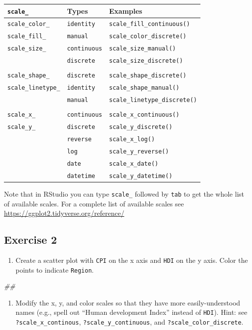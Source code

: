 \documentclass[]{book}
\newenvironment{Shaded}{\begin{snugshade}}{\end{snugshade}}
\newcommand{\CommentTok}[1]{\textcolor[rgb]{0.56,0.35,0.01}{\textit{#1}}}
\providecommand{\tightlist}{%
  \setlength{\itemsep}{0pt}\setlength{\parskip}{0pt}}
\begin{document}
\begin{longtable}[]{@{}lll@{}}
\toprule
\texttt{scale\_} & Types & Examples\tabularnewline
\midrule
\endhead
\texttt{scale\_color\_} & \texttt{identity} & \texttt{scale\_fill\_continuous()}\tabularnewline
\texttt{scale\_fill\_} & \texttt{manual} & \texttt{scale\_color\_discrete()}\tabularnewline
\texttt{scale\_size\_} & \texttt{continuous} & \texttt{scale\_size\_manual()}\tabularnewline
& \texttt{discrete} & \texttt{scale\_size\_discrete()}\tabularnewline
& &\tabularnewline
\texttt{scale\_shape\_} & \texttt{discrete} & \texttt{scale\_shape\_discrete()}\tabularnewline
\texttt{scale\_linetype\_} & \texttt{identity} & \texttt{scale\_shape\_manual()}\tabularnewline
& \texttt{manual} & \texttt{scale\_linetype\_discrete()}\tabularnewline
& &\tabularnewline
\texttt{scale\_x\_} & \texttt{continuous} & \texttt{scale\_x\_continuous()}\tabularnewline
\texttt{scale\_y\_} & \texttt{discrete} & \texttt{scale\_y\_discrete()}\tabularnewline
& \texttt{reverse} & \texttt{scale\_x\_log()}\tabularnewline
& \texttt{log} & \texttt{scale\_y\_reverse()}\tabularnewline
& \texttt{date} & \texttt{scale\_x\_date()}\tabularnewline
& \texttt{datetime} & \texttt{scale\_y\_datetime()}\tabularnewline
\bottomrule
\end{longtable}

Note that in RStudio you can type \texttt{scale\_} followed by \texttt{tab} to get the whole list of available scales. For a complete list of available scales see \url{https://ggplot2.tidyverse.org/reference/}

\hypertarget{exercise-2-1}{%
\subsection{Exercise 2}\label{exercise-2-1}}

\begin{enumerate}
\def\labelenumi{\arabic{enumi}.}
\tightlist
\item
  Create a scatter plot with \texttt{CPI} on the x axis and \texttt{HDI} on the y axis. Color the points to indicate \texttt{Region}.
\end{enumerate}

\begin{Shaded}
\begin{Highlighting}[]
\CommentTok{## }
\end{Highlighting}
\end{Shaded}

\begin{enumerate}
\def\labelenumi{\arabic{enumi}.}
\setcounter{enumi}{1}
\tightlist
\item
  Modify the x, y, and color scales so that they have more easily-understood names (e.g., spell out ``Human development Index'' instead of \texttt{HDI}). Hint: see \texttt{?scale\_x\_continous}, \texttt{?scale\_y\_continuous}, and \texttt{?scale\_color\_discrete}.
\end{enumerate}
\end{document}
